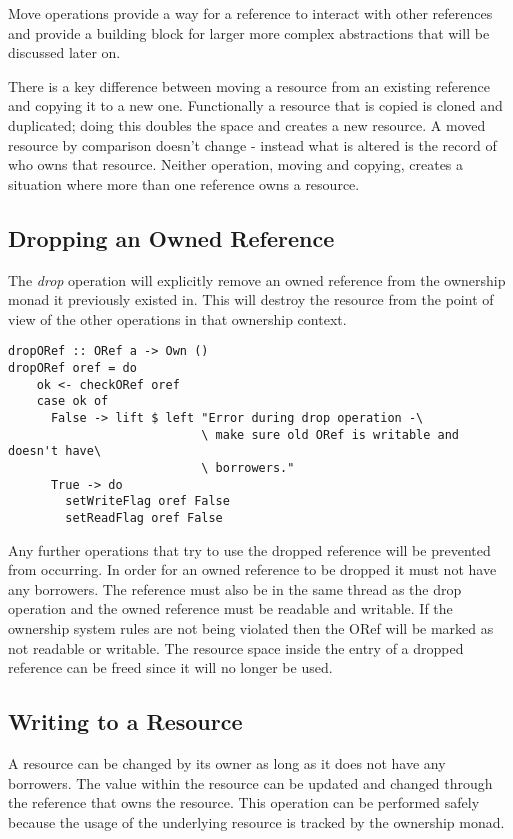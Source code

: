 \documentclass[onehalf,11pt]{beavtex}
\begin{document}
Move operations provide a way for a reference to interact with
other references and provide a building block for larger more complex
abstractions that will be discussed later on.

There is a key difference between moving a resource from an existing reference
and copying it to a new one.  Functionally a resource that is copied is cloned
and duplicated; doing this doubles the space and creates a new resource.
A moved resource by comparison doesn't change - instead what is altered is the
record of who owns that resource.  Neither operation, moving and copying,
creates a situation where more than one reference owns a resource.

\subsection{Dropping an Owned Reference}

The \textit{drop} operation will explicitly remove an owned reference from the
ownership monad it previously existed in.
This will destroy the resource from the point of view of the other operations
in that ownership context.

\begin{verbatim}
dropORef :: ORef a -> Own ()
dropORef oref = do
    ok <- checkORef oref
    case ok of
      False -> lift $ left "Error during drop operation -\
                           \ make sure old ORef is writable and doesn't have\
                           \ borrowers."
      True -> do
        setWriteFlag oref False
        setReadFlag oref False
\end{verbatim}

Any further operations that try to use the dropped reference will be prevented
from occurring.
In order for an owned reference to be dropped it must not have any borrowers.
The reference must also be in the same thread as the drop operation and
the owned reference must be readable and writable. If the ownership system rules
are not being violated then the ORef will be marked as not readable or writable.
The resource space inside the entry of a dropped reference can be freed since
it will no longer be used.

\subsection{Writing to a Resource}

A resource can be changed by its owner as long as it does not have any borrowers.
The value within the resource can be updated and changed through the reference
that owns the resource. This operation can be performed safely because the usage
of the underlying resource is tracked by the ownership monad.
\end{document}
